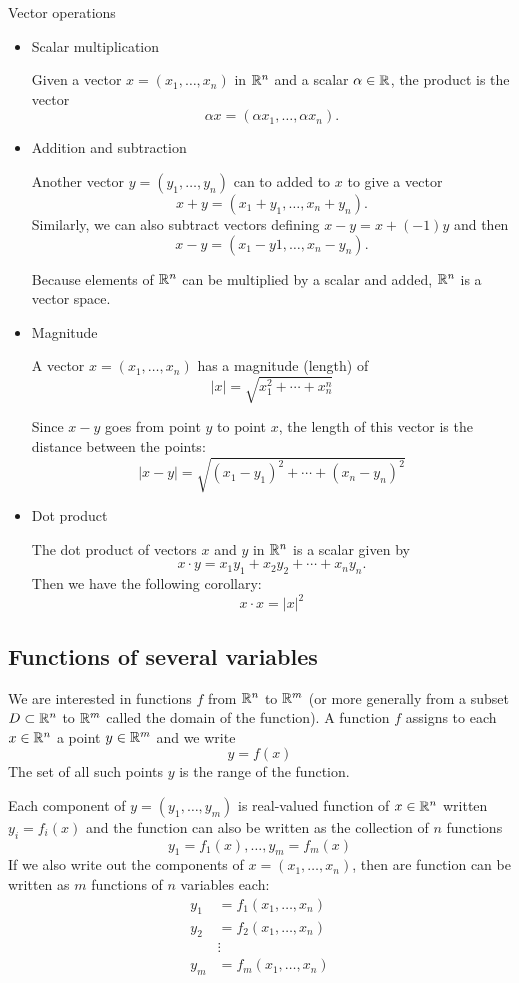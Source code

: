Vector operations
\begin{itemize}
\item Scalar multiplication

Given a vector $x = (x_1, \dots, x_n)$ in $\mathbb R^n$ and a scalar $\alpha \in \mathbb R$, the product is the vector 
\[ \alpha x = (\alpha x_1, \dots, \alpha x_n). \]

\item Addition and subtraction

Another vector $y = (y_1, \dots, y_n)$ can to added to $x$ to give a vector
\[ x+y = (x_1+y_1, \dots, x_n+y_n). \]
Similarly, we can also subtract vectors defining $x-y=x+(-1)y$ and then
\[ x-y = (x_1-y1, \dots, x_n-y_n). \]

\begin{remark}
Because elements of $\mathbb R^n$ can be multiplied by a scalar and added, $\mathbb R^n$ is a vector space.
\end{remark}

\item Magnitude

A vector $x = (x_1, \dots, x_n)$ has a magnitude (length) of
\[ |x| = \sqrt{x_1^2+\cdots+x_n^n} \]

Since $x-y$ goes from point $y$ to point $x$, the length of this vector is the distance between the points:
\[ |x-y| = \sqrt{(x_1-y_1)^2+\cdots+(x_n-y_n)^2} \]

\item Dot product

The dot product of vectors $x$ and $y$ in $\mathbb R^n$ is a scalar given by
\[ x \cdot y = x_1y_1 + x_2y_2 + \cdots + x_ny_n. \]
Then we have the following corollary:
\[ x \cdot x = |x|^2 \]

\end{itemize}

\subsection{Functions of several variables}
We are interested in functions $f$ from $\mathbb R^n$ to $\mathbb R^m$ (or more generally from a subset $D \subset \mathbb R^n$ to $\mathbb R^m$ called the domain of the function). A function $f$ assigns to each $x \in \mathbb R^n$ a point $y \in \mathbb R^m$ and we write
\[ y=f(x) \]
The set of all such points $y$ is the range of the function.

Each component of $y = (y_1, \dots, y_m)$ is real-valued function of $x \in \mathbb R^n$ written $y_i = f_i(x)$ and the function can also be written as the collection of $n$ functions
\[ y_1 = f_1(x), \dots, y_m = f_m(x) \]
If we also write out the components of $x = (x_1, \dots, x_n)$, then are function can be written as $m$ functions of $n$ variables each:
\[ \begin{split}
y_1 &= f_1(x_1, \dots, x_n) \\
y_2 &= f_2(x_1, \dots, x_n) \\
&\vdots \\
y_m &= f_m(x_1, \dots, x_n)
\end{split} \]


